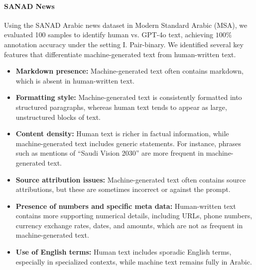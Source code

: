 \paragraph{SANAD News}
Using the SANAD Arabic news dataset in Modern Standard Arabic (MSA), we evaluated 100 samples to identify human vs. GPT-4o text, achieving $100\%$ annotation accuracy under the setting I. Pair-binary.
We identified several key features that differentiate machine-generated text from human-written text.
\begin{itemize}
    \item \textbf{Markdown presence:} 
    Machine-generated text often contains markdown, which is absent in human-written text.

    \item \textbf{Formatting style:} 
    Machine-generated text is consistently formatted into structured paragraphs, whereas human text tends to appear as large, unstructured blocks of text.

    \item \textbf{Content density:} 
    Human text is richer in factual information, while machine-generated text includes generic statements. For instance, phrases such as 
    mentions of ``Saudi Vision 2030'' are more frequent in machine-generated text. 

    \item \textbf{Source attribution issues:} 
    Machine-generated text often contains source attributions, but these are sometimes incorrect or against the prompt. 

    \item \textbf{Presence of numbers and specific meta data:} 
    Human-written text contains more supporting numerical details, including URLs, phone numbers, currency exchange rates, dates, and amounts, which are not as frequent in machine-generated text.

    \item \textbf{Use of English terms:} 
    Human text includes sporadic English terms, especially in specialized contexts, while machine text remains fully in Arabic.


\end{itemize}
